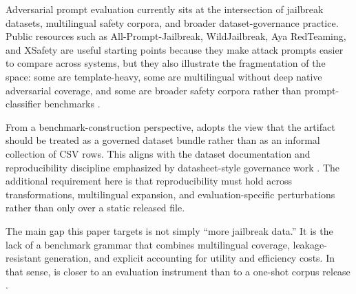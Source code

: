 Adversarial prompt evaluation currently sits at the intersection of jailbreak datasets, multilingual safety corpora, and broader dataset-governance practice. Public resources such as All-Prompt-Jailbreak, WildJailbreak, Aya RedTeaming, and XSafety are useful starting points because they make attack prompts easier to compare across systems, but they also illustrate the fragmentation of the space: some are template-heavy, some are multilingual without deep native adversarial coverage, and some are broader safety corpora rather than prompt-classifier benchmarks \citep{allpromptjailbreak2024,wildjailbreak2024,ayaredteaming2024,xsafety2024}.

From a benchmark-construction perspective, \system adopts the view that the artifact should be treated as a governed dataset bundle rather than as an informal collection of CSV rows. This aligns with the dataset documentation and reproducibility discipline emphasized by datasheet-style governance work \citep{gebru2021datasheets}. The additional requirement here is that reproducibility must hold across transformations, multilingual expansion, and evaluation-specific perturbations rather than only over a static released file.

The main gap this paper targets is not simply ``more jailbreak data.'' It is the lack of a benchmark grammar that combines multilingual coverage, leakage-resistant generation, and explicit accounting for utility and efficiency costs. In that sense, \system is closer to an evaluation instrument than to a one-shot corpus release \citep{shibbolethdraft2026}.
